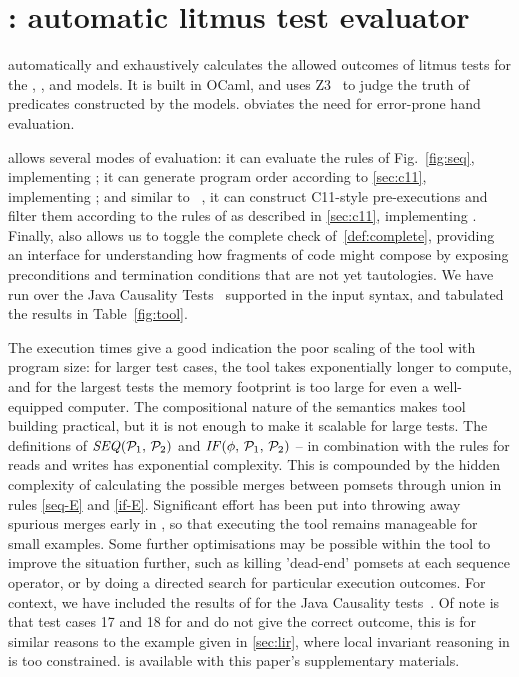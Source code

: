 \section{\PwTerTITLE: automatic litmus test evaluator}
\label{sec:tool}

\PwTer{} automatically and exhaustively calculates the allowed outcomes of litmus tests for the \PwT, \PwTpo, and \PwTc{} models. It is built in OCaml, and uses Z3~\cite{Z3Solver} to judge the truth of predicates constructed by the models. \PwTer{} obviates the need for error-prone hand evaluation.

\PwTer{} allows several modes of evaluation: it can evaluate the rules of Fig.~\ref{fig:seq}, implementing \PwT; it can generate program order according to \textsection\ref{sec:c11}, implementing \PwTpo; and similar to \MRD~\cite{DBLP:conf/esop/PaviottiCPWOB20}, it can construct C11-style pre-executions and filter them according to the rules of \rcXI{} as described in \textsection\ref{sec:c11}, implementing \PwTc{}.
Finally, \PwTer{} also allows us to toggle the complete check of~\ref{def:complete}, providing an interface for understanding how fragments of code might compose by exposing preconditions and termination conditions that are not yet tautologies.
We have run \PwTer{} over the Java Causality Tests~\cite{PughWebsite} supported in the input syntax, and tabulated the results in Table~\ref{fig:tool}.

The execution times give a good indication the poor scaling of the tool with program size: for larger test cases, the tool takes exponentially longer to compute, and for the largest tests the memory footprint is too large for even a well-equipped computer.
The compositional nature of the semantics makes tool building practical, but it is not enough to make it scalable for large tests.
The definitions of $\sSEMI{\aPSS_1}{\aPSS_2}$ and $\sIF{\aForm}\sTHEN\aPSS_1\sELSE\aPSS_2\sFI$ -- in combination with the rules for reads and writes has exponential complexity.
This is compounded by the hidden complexity of calculating the possible merges between pomsets through union in rules \ref{seq-E} and \ref{if-E}.
Significant effort has been put into throwing away spurious merges early in \PwTer, so that executing the tool remains manageable for small examples.
Some further optimisations may be possible within the tool to improve the situation further, such as killing 'dead-end' pomsets at each sequence operator, or by doing a directed search for particular execution outcomes.
For context, we have included the results of \MRD{} for the Java Causality tests~\cite{DBLP:conf/esop/PaviottiCPWOB20}.
Of note is that test cases 17 and 18 for \MRD{} and \MRDRC{} do not give the correct outcome, this is for similar reasons to the example given in \textsection\ref{sec:lir}, where local invariant reasoning in \MRD{} is too constrained.
\PwTer{} is available with this paper's supplementary materials.

